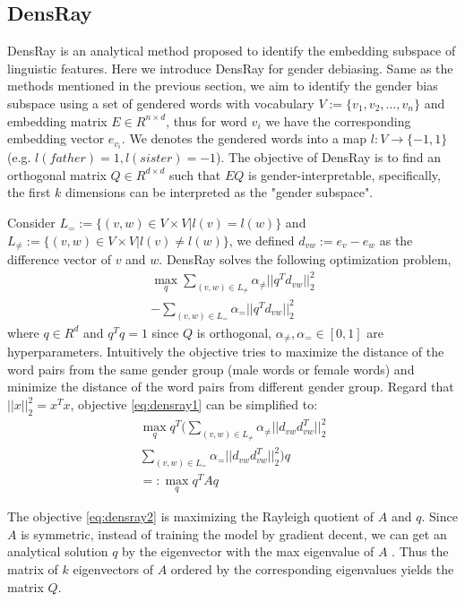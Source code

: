 \subsection{DensRay}
DensRay is an analytical method proposed to identify the embedding subspace of linguistic features. Here we introduce DensRay for gender debiasing. Same as the methods mentioned in the previous section, we aim to identify the gender bias subspace using a set of gendered words with vocabulary $V:=\{v_1,v_2,\dots,v_n\}$ and embedding matrix $E \in R^{n\times d}$, thus for word $v_i$ we have the corresponding embedding vector $e_{v_i}$. We denotes the gendered words into a map $l:V\to \{-1,1\}$ (e.g. $l(father)=1,l(sister)=-1 $). The objective of DensRay is to find an orthogonal matrix $Q\in R^{d\times d}$ such that $EQ$ is gender-interpretable, specifically, the first $k$ dimensions can be interpreted as the "gender subspace".

Consider $L_{=}:=\{(v,w)\in V\times V|l(v)=l(w)\}$ and $L_{\neq}:=\{(v,w)\in V\times V|l(v)\neq l(w)\}$, we defined $d_{vw}:=e_v-e_w$ as the difference vector of $v$ and $w$. DensRay solves the following optimization problem,
\begin{eqnarray}
    \mathop{max}\limits_{q} 
    \sum_{(v,w)\in L_{\neq}}\alpha_{\neq}||q^Td_{vw}||^2_2\nonumber\\
    -\sum_{(v,w)\in L_{=}}\alpha_{=}||q^Td_{vw}||^2_2
\label{eq:densray1}
\end{eqnarray}
where $q\in R^d$ and $q^Tq=1$ since $Q$ is orthogonal, $\alpha_{\neq},\alpha_{=}\in [0,1]$ are hyperparameters. Intuitively the objective tries to maximize the distance of the word pairs from the same gender group (male words or female words) and minimize the distance of the word pairs from different gender group. Regard that $||x||^2_2=x^Tx$, objective \ref{eq:densray1} can be simplified to:
\begin{eqnarray}
    \mathop{max}\limits_{q} q^T(
    \sum_{(v,w)\in L_{\neq}}\alpha_{\neq}||d_{vw}d_{vw}^T||^2_2\nonumber\\
    \sum_{(v,w)\in L_{=}}\alpha_{=}||d_{vw}d_{vw}^T||^2_2)q\nonumber\\
    =:\mathop{max}\limits_{q} q^TAq
\label{eq:densray2}
\end{eqnarray}

The objective \ref{eq:densray2} is maximizing the Rayleigh quotient of $A$ and $q$. Since $A$ is symmetric, instead of training the model by gradient decent, we can get an analytical solution $q$ by the eigenvector with the max eigenvalue of $A$ \citep{horn1990matrix}. Thus the matrix of $k$ eigenvectors of $A$ ordered by the corresponding eigenvalues yields the matrix $Q$.